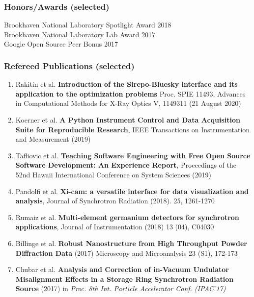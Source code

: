 \documentclass[12pt]{article}
\numberwithin{page}{section}
\begin{document}
\subsubsection*{Honors/Awards (selected)}
Brookhaven National Laboratory Spotlight  Award \hfill 2018\\
Brookhaven National Laboratory Lab Award \hfill 2017\\
Google Open Source Peer Bonus \hfill 2017

\subsubsection*{Refereed Publications (selected)}

\begin{enumerate}[noitemsep]
    \item Rakitin et al. \textbf{Introduction of the Sirepo-Bluesky
    interface and its application to the optimization problems}
    Proc. SPIE 11493, Advances in Computational Methods for X-Ray
    Optics V, 1149311 (21 August 2020)

  \item Koerner et al. \textbf{A Python Instrument Control and Data
    Acquisition Suite for Reproducible Research}, IEEE Transactions on
    Instrumentation and Measurement (2019)

  \item Tafliovic et al. \textbf{Teaching Software Engineering with
    Free Open Source Software Development: An Experience Report},
    Proceedings of the 52nd Hawaii International Conference on System
    Sciences (2019)

  \item Pandolfi et al. \textbf{Xi-cam: a versatile interface for data
    visualization and analysis}, Journal of Synchrotron Radiation
    (2018). 25, 1261-1270

  \item Rumaiz et al. \textbf{Multi-element germanium detectors for
    synchrotron applications}, Journal of Instrumentation (2018) 13
    (04), C04030

  \item Billinge et al. \textbf{Robust Nanostructure from High
    Throughput Powder Diffraction Data} (2017) Microscopy and
    Microanalysis 23 (S1), 172-173

  \item Chubar et al. \textbf{Analysis and Correction of in-Vacuum
    Undulator Misalignment Effects in a Storage Ring Synchrotron
    Radiation Source} (2017) in \emph{Proc. 8th Int. Particle
    Accelerator Conf. (IPAC'17)}


\end{enumerate}
\end{document}
